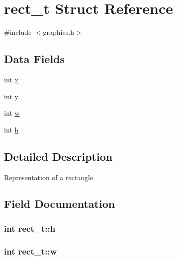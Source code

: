 \hypertarget{structrect__t}{}\section{rect\+\_\+t Struct Reference}
\label{structrect__t}


{\ttfamily \#include $<$graphics.\+h$>$}

\subsection*{Data Fields}
\begin{DoxyCompactItemize}
\item 
int \hyperlink{structrect__t_aac9f3f28f20b5ed45f64fac971269dc3}{x}
\item 
int \hyperlink{structrect__t_a0683ba02d080cdcaeacbf0ab28c73083}{y}
\item 
int \hyperlink{structrect__t_a23768d8ecceecea9f1b8b82edbfed684}{w}
\item 
int \hyperlink{structrect__t_a18f3ee8389363a4a98226d5b9ae117c8}{h}
\end{DoxyCompactItemize}


\subsection{Detailed Description}
Representation of a rectangle 

\subsection{Field Documentation}
\subsubsection[{\texorpdfstring{h}{h}}]{\setlength{\rightskip}{0pt plus 5cm}int rect\+\_\+t\+::h}\hypertarget{structrect__t_a18f3ee8389363a4a98226d5b9ae117c8}{}\label{structrect__t_a18f3ee8389363a4a98226d5b9ae117c8}
\subsubsection[{\texorpdfstring{w}{w}}]{\setlength{\rightskip}{0pt plus 5cm}int rect\+\_\+t\+::w}\hypertarget{structrect__t_a23768d8ecceecea9f1b8b82edbfed684}{}\label{structrect__t_a23768d8ecceecea9f1b8b82edbfed684}
